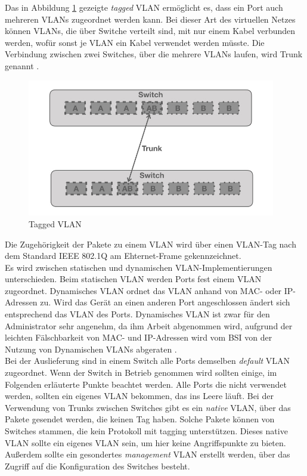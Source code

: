 Das in Abbildung \ref{vlanpak} gezeigte \emph{tagged} VLAN ermöglicht es, dass ein Port auch mehreren VLANs zugeordnet werden kann. Bei  dieser Art des virtuellen Netzes können VLANs, die über  Switche verteilt sind, mit nur einem Kabel verbunden werden, wofür sonst je VLAN ein Kabel verwendet werden müsste. Die Verbindung zwischen zwei Switches, über die mehrere VLANs laufen, wird Trunk genannt \cite{cisco14rout}. 

\begin{figure}[h]
\centering
	\includegraphics[width=0.8\linewidth,height=6cm]{vlan.002.jpeg}
	\caption{Tagged VLAN}
	\label{vlanpak}
\end{figure} 

Die Zugehörigkeit der Pakete zu einem VLAN wird über einen VLAN-Tag nach dem Standard  IEEE 802.1Q am Ehternet-Frame gekennzeichnet.\\

Es wird zwischen statischen und dynamischen VLAN-Implementierungen unterschieden. Beim statischen VLAN werden Ports fest einem VLAN zugeordnet. Dynamisches VLAN ordnet das VLAN anhand von MAC- oder IP-Adressen zu. Wird das Gerät an einen anderen Port angeschlossen ändert sich entsprechend das VLAN des Ports. Dynamisches VLAN ist zwar für den Administrator sehr angenehm, da ihm Arbeit abgenommen wird, aufgrund der leichten Fälschbarkeit von MAC- und IP-Adressen wird vom BSI von der Nutzung von Dynamischen VLANs abgeraten \cite{bsiLogSeg}.
\\

Bei der Auslieferung sind in einem Switch alle Ports demselben \emph{default} VLAN zugeordnet. Wenn der Switch in Betrieb genommen wird sollten einige, im Folgenden erläuterte  Punkte beachtet werden. Alle Ports die nicht verwendet werden, sollten ein eigenes VLAN bekommen, das ins Leere läuft. Bei der Verwendung von Trunks zwischen Switches gibt es ein \emph{native} VLAN, über das Pakete gesendet werden, die keinen Tag haben. Solche Pakete können von Switches stammen, die kein Protokoll mit tagging unterstützen. Dieses native VLAN sollte ein eigenes VLAN sein, um hier keine Angriffspunkte zu bieten. Außerdem sollte ein gesondertes \emph{management} VLAN erstellt werden, über das Zugriff auf die Konfiguration des  Switches besteht. 




